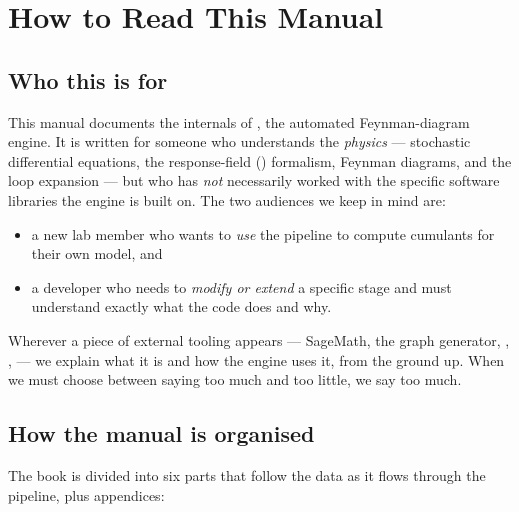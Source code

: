 \chapter*{How to Read This Manual}

\section*{Who this is for}

This manual documents the internals of \Daedalus{}, the automated
\msrjd{} Feynman-diagram engine.  It is written for someone who
understands the \emph{physics} --- stochastic differential equations, the
response-field (\msrjd) formalism, Feynman diagrams, and the loop expansion ---
but who has \emph{not} necessarily worked with the specific software libraries
the engine is built on.  The two audiences we keep in mind are:

\begin{itemize}[nosep]
  \item a new lab member who wants to \emph{use} the pipeline to compute
        cumulants for their own model, and
  \item a developer who needs to \emph{modify or extend} a specific stage and
        must understand exactly what the code does and why.
\end{itemize}

Wherever a piece of external tooling appears --- SageMath, the 
graph generator, , ,  --- we explain what it
is and how the engine uses it, from the ground up.  When we must choose between
saying too much and too little, we say too much.

\section*{How the manual is organised}

The book is divided into six parts that follow the data as it flows through the
pipeline, plus appendices:


